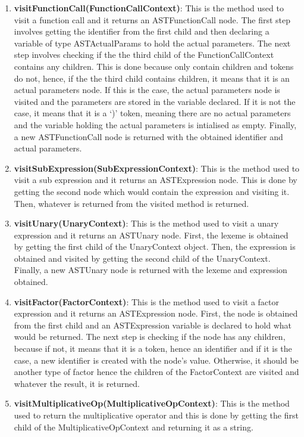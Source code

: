 \documentclass{article}
\begin{document}
\begin{enumerate}
					\item \textbf{visitFunctionCall(FunctionCallContext)}: This is the method used to visit a function call and it returns an ASTFunctionCall node. The first step involves getting the identifier from the first child and then declaring a variable of type ASTActualParams to hold the actual parameters. The next step involves checking if the the third child of the FunctionCallContext contains any children. This is done because only contain children and tokens do not, hence, if the the third child contains children, it means that it is an actual parameters node. If this is the case, the actual parameters node is visited and the parameters are stored in the variable declared. If it is not the case, it means that it is a `)' token, meaning there are no actual parameters and the variable holding the actual parameters is intialised as empty. Finally, a new ASTFunctionCall node is returned with the obtained identifier and actual parameters.
					
					\item \textbf{visitSubExpression(SubExpressionContext)}: This is the method used to visit a sub expression and it returns an ASTExpression node. This is done by getting the second node which would contain the expression and visiting it. Then, whatever is returned from the visited method is returned.
					
					\item \textbf{visitUnary(UnaryContext)}: This is the method used to visit a unary expression and it returns an ASTUnary node. First, the lexeme is obtained by getting the first child of the UnaryContext object. Then, the expression is obtained and visited by getting the second child of the UnaryContext. Finally, a new ASTUnary node is returned with the lexeme and expression obtained.
					
					\item \textbf{visitFactor(FactorContext)}: This is the method used to visit a factor expression and it returns an ASTExpression node. First, the node is obtained from the first child and an ASTExpression variable is declared to hold what would be returned. The next step is checking if the node has any children, because if not, it means that it is a token, hence an identifier and if it is the case, a new identifier is created with the node's value. Otherwise, it should be another type of factor hence the children of the FactorContext are visited and whatever the result, it is returned.
					
					\item \textbf{visitMultiplicativeOp(MultiplicativeOpContext)}: This is the method used to return the multiplicative operator and this is done by getting the first child of the MultiplicativeOpContext and returning it as a string.
					

\end{enumerate}
\end{document}
